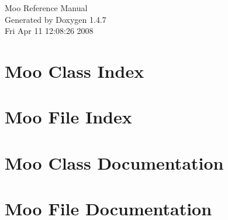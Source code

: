\documentclass[a4paper]{book}
\begin{document}
\begin{titlepage}
\vspace*{7cm}
\begin{center}
{\Large Moo Reference Manual}\\
\vspace*{1cm}
{\large Generated by Doxygen 1.4.7}\\
\vspace*{0.5cm}
{\small Fri Apr 11 12:08:26 2008}\\
\end{center}
\end{titlepage}
\clearemptydoublepage
{}
\tableofcontents
\clearemptydoublepage
{}
\chapter{Moo Class Index}

\chapter{Moo File Index}

\chapter{Moo Class Documentation}

\chapter{Moo File Documentation}

\printindex
\end{document}
